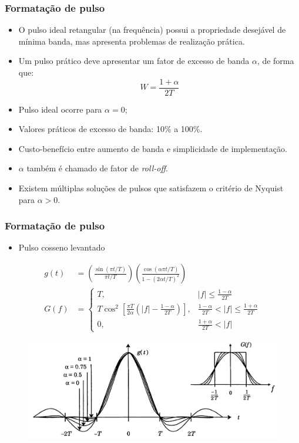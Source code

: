 \begin{frame}
	\frametitle{Formatação de pulso}

	\begin{itemize}
	    \item O pulso ideal retangular (na frequência) possui a propriedade desejável de mínima banda, mas apresenta problemas de realização prática.
	    \item Um pulso prático deve apresentar um fator de excesso de banda $\alpha$, de forma que:
	    \begin{equation*}
		W = \frac{1+\alpha}{2T}
	    \end{equation*}
	    \item Pulso ideal ocorre para $\alpha=0$;
	    \item Valores práticos de excesso de banda: 10\% a 100\%.
	    \item Custo-benefício entre aumento de banda e simplicidade de implementação.
	    \item $\alpha$ também é chamado de fator de \textit{roll-off}.
	    \item Existem múltiplas soluções de pulsos que satisfazem o critério de Nyquist para $\alpha >0$.
	\end{itemize}			
\end{frame}

\begin{frame}
	\frametitle{Formatação de pulso}

	\begin{itemize}
	    \item Pulso cosseno levantado
	\end{itemize}
	\begin{small}
	\begin{align*}
	    g(t) &= \left( \frac{\sin(\pi t/T)}{\pi t/T} \right) \left( \frac{\cos(\alpha \pi t/T)}{1-(2\alpha t/T)^2} \right) \\
	    G(f) &= \begin{cases}
			T, & |f| \leq \frac{1-\alpha}{2T} \\
			T\cos^2\left[ \frac{\pi T}{2\alpha} \left(|f| - \frac{1-\alpha}{2T} \right) \right], & \frac{1-\alpha}{2T} < |f| \leq \frac{1+\alpha}{2T} \\
			0, & \frac{1+\alpha}{2T} < |f|
	            \end{cases}
	\end{align*}
	\end{small}
	\begin{figure}[t]	
	  \begin{center}
	    \includegraphics[width=0.8\columnwidth]{figs/pam_06}
	  \end{center}
	\end{figure}
\end{frame}


